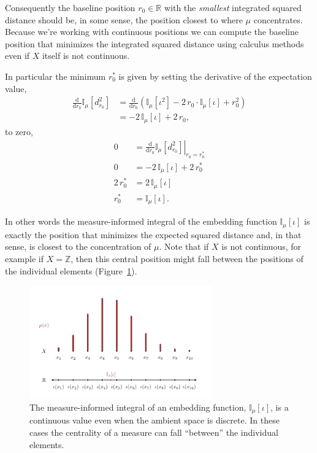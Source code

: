\documentclass[
  letterpaper,
  DIV=11,
  numbers=noendperiod]{scrartcl}
\begin{document}
Consequently the baseline position \(r_{0} \in \mathbb{R}\) with the
\emph{smallest} integrated squared distance should be, in some sense,
the position closest to where \(\mu\) concentrates. Because we're
working with continuous positions we can compute the baseline position
that minimizes the integrated squared distance using calculus methods
even if \(X\) itself is not continuous.

In particular the minimum \(r_{0}^{*}\) is given by setting the
derivative of the expectation value, \begin{align*}
\frac{\mathrm{d}}{\mathrm{d} r_{0} }
\mathbb{I}_{\mu} \left[ d_{r_{0}}^{2} \right]
&=
\frac{\mathrm{d}}{\mathrm{d} r_{0} }
\left( \mathbb{I}_{\mu} \left[ \iota^{2} \right]
-2 \, r_{0} \cdot \mathbb{I}_{\mu} \left[ \iota \right]
+ r_{0}^{2} \right)
\\
&=
-2 \, \mathbb{I}_{\mu} \left[ \iota \right]
+ 2 \, r_{0},
\end{align*} to zero, \begin{align*}
0
&= \left. \frac{\mathrm{d}}{\mathrm{d} r_{0} }
\mathbb{I}_{\mu} \left[ d_{r_{0}}^{2} \right] \right|_{r_{0} = r_{0}^{*}}
\\
0
&=
-2 \, \mathbb{I}_{\mu} \left[ \iota \right]
+ 2 \, r_{0}^{*}
\\
2 \, r_{0}^{*}
&=
2 \, \mathbb{I}_{\mu} \left[ \iota \right]
\\
r_{0}^{*}
&=
\mathbb{I}_{\mu} \left[ \iota \right].
\end{align*}

In other words the measure-informed integral of the embedding function
\(\mathbb{I}_{\mu} [ \iota ]\) is exactly the position that minimizes
the expected squared distance and, in that sense, is closest to the
concentration of \(\mu\). Note that if \(X\) is not continuous, for
example if \(X = \mathbb{Z}\), then this central position might fall
between the positions of the individual elements
(Figure~\ref{fig-mean}).

\begin{figure}

{\centering \includegraphics[width=0.7\textwidth,height=\textheight]{figures/mean/mean.pdf}

}

\caption{\label{fig-mean}The measure-informed integral of an embedding
function, \(\mathbb{I}_{\mu} [ \iota ]\), is a continuous value even
when the ambient space is discrete. In these cases the centrality of a
measure can fall ``between'' the individual elements.}

\end{figure}
\end{document}
